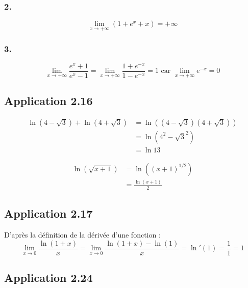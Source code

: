 \documentclass[a4paper,10pt]{report}
\begin{document}
\subsubsection*{2.}
\begin{displaymath}
	\lim_{x \rightarrow +\infty} (1 + e^x + x)= +\infty
\end{displaymath}

\subsubsection*{3.}
\begin{displaymath}
	\lim_{x \rightarrow +\infty} \frac{e^x+1}{e^x-1}= \lim_{x \rightarrow +\infty} \frac{1+e^{-x}}{1-e^{-x}} = 1 \text{ car }
	\lim_{x \rightarrow +\infty} e^{-x} = 0
\end{displaymath}


\subsection*{Application 2.16}

\begin{equation*}
	\begin{split}
		\ln(4-\sqrt{3}) + \ln(4+\sqrt{3})
		&= \ln ((4-\sqrt{3})(4+\sqrt{3}))\\
		&= \ln (4^2-\sqrt{3}^2) \\
		&= \ln 13
	\end{split}
\end{equation*}

\begin{equation*}
	\begin{split}
		\ln(\sqrt{x+1})
		&= 	\ln((x+1)^{1/2})\\
		&= \frac{\ln(x+1)}{2}
	\end{split}
\end{equation*}

\subsection*{Application 2.17}
D'après la définition de la dérivée d'une fonction :
\begin{displaymath}
\lim_{x \rightarrow 0} \frac{\ln(1+x)}{x} = \lim_{x \rightarrow 0} \frac{\ln(1+x) - \ln(1)}{x} = \ln'(1) = \frac{1}{1} = 1
\end{displaymath}


\subsection*{Application 2.24}
\end{document}
